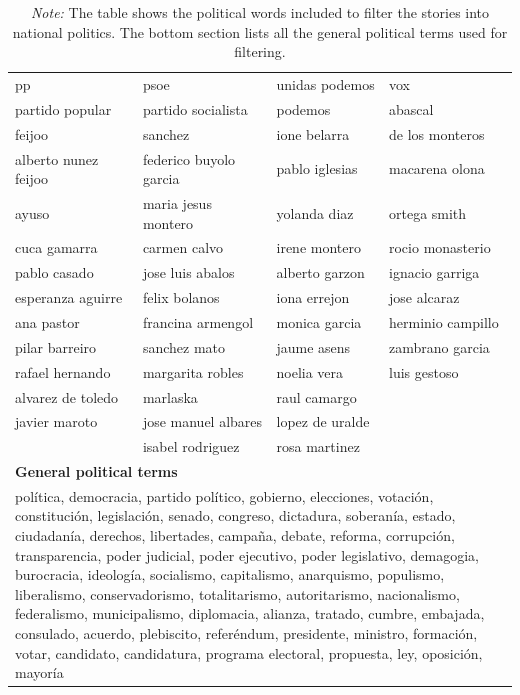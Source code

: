 \documentclass[12pt]{article}
\begin{document}
\begin{table}[!htb]
{\begin{longtable}{|l|l|l|l|}
		pp                       & psoe                       & unidas podemos     & vox               \\
		partido popular          & partido socialista         & podemos             & abascal           \\
		feijoo                   & sanchez                    & ione belarra        & de los monteros   \\
		alberto nunez feijoo     & federico buyolo garcia     & pablo iglesias      & macarena olona    \\
		ayuso                    & maria jesus montero        & yolanda diaz        & ortega smith      \\
		cuca gamarra             & carmen calvo               & irene montero       & rocio monasterio  \\
		pablo casado             & jose luis abalos           & alberto garzon      & ignacio garriga   \\
		esperanza aguirre        & felix bolanos              & iona errejon        & jose alcaraz      \\
		ana pastor               & francina armengol          & monica garcia       & herminio campillo \\
		pilar barreiro           & sanchez mato               & jaume asens         & zambrano garcia   \\
		rafael hernando          & margarita robles           & noelia vera         & luis gestoso      \\
		alvarez de toledo        & marlaska                   & raul camargo        &                   \\
		javier maroto            & jose manuel albares        & lopez de uralde     &                   \\
		& isabel rodriguez           & rosa martinez       &                   \\
		\hline
		\multicolumn{4}{|l|}{\textbf{General political terms}}\\
		\hline
		\multicolumn{4}{|p{.95\linewidth}|}{%
			política, democracia, partido político, gobierno, elecciones, votación, constitución, legislación, senado, congreso, dictadura, soberanía, estado, ciudadanía, derechos, libertades, campaña, debate, reforma, corrupción, transparencia, poder judicial, poder ejecutivo, poder legislativo, demagogia, burocracia, ideología, socialismo, capitalismo, anarquismo, populismo, liberalismo, conservadorismo, totalitarismo, autoritarismo, nacionalismo, federalismo, municipalismo, diplomacia, alianza, tratado, cumbre, embajada, consulado, acuerdo, plebiscito, referéndum, presidente, ministro, formación, votar, candidato, candidatura, programa electoral, propuesta, ley, oposición, mayoría%
		}\\
		\hline
	\end{longtable}
}


\caption*{\small  \textit{Note:} The table shows the political words included to filter the stories into national politics. The bottom section lists all the general political terms used for filtering.}


\end{table}
\end{document}
